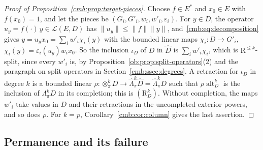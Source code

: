 \documentclass[11pt]{amsart}
\theoremstyle{definition}
\theoremstyle{remark}
\numberwithin{equation}{section}
\newcommand{\cL}{\mathcal L}
\newcommand{\norm}[1]{\lVert #1\rVert}
\theoremstyle{plain}
\theoremstyle{definition}
\theoremstyle{plain}
\newcommand{\alt}{\operatorname{alt}}
\begin{document}
\begin{proof}[Proof of Proposition~\ref{cmb:prop:target-pieces}]
Choose $f\in E^*$ and $x_0\in E$ with $f(x_0)=1$, and let the pieces be $(G_i,G'_i,w_i,w'_i,\varepsilon_i)$. For $y\in D$,
the operator $u_y=f(\cdot)\,y\in\cL(E,D)$ has $\norm{u_y}\le\norm f\norm y$, and~\eqref{cmb:eq:decomposition} gives
$y=u_yx_0=\sum_iw'_i\chi_i(y)$ with the bounded linear maps $\chi_i\colon D\to G'_i$, $\chi_i(y)=\varepsilon_i(u_y)w_ix_0$.
So the inclusion $\iota_D$ of $D$ in $\widehat D$ is $\sum_iw'_i\chi_i$, which is $\mathrm R^{\le k}$-split, since every
$w'_i$ is, by Proposition~\ref{ob:prop:split-operators}(2) and the paragraph on split operators in
Section~\ref{cmb:ssec:degrees}. A
retraction for $\iota_D$ in degree $k$ is a bounded linear
$\rho\colon\otimes^k_\pi D\to\widehat\Lambda^k_\pi\widehat D=\widehat\Lambda^k_\pi D$ such that $\rho\alt^k_D$ is the
inclusion of $\Lambda^k_\pi D$ in its completion; this is $(\mathrm R^k_D)$. Without completion, the maps $w'_i$ take values
in $D$ and their retractions in the uncompleted exterior powers, and so does $\rho$. For $k=p$,
Corollary~\ref{cmb:cor:column} gives the last assertion.
\end{proof}

\subsection{Permanence and its failure}\label{dgr:ssec:permanence}
\end{document}
